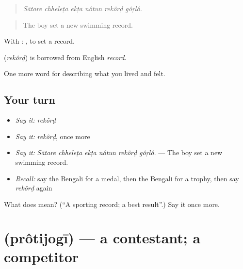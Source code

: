 \begin{quote}
     
\end{quote}

\begin{quote}
\emph{Sā̃tāre chheleṭā ekṭā nôtun rekôrḍ gôṛlô.}
\end{quote}

\begin{quote}
The boy set a new swimming record.
\end{quote}

With :  , to set a record.

\begin{cousinweb}
\textbf{} (\emph{rekôrḍ}) is borrowed from English \emph{record}.
\end{cousinweb}

\begin{grammarlens}[title={What you've built}]
One more word for describing what you lived and felt.
\end{grammarlens}

\subsection*{Your turn}
\begin{itemize}
\raggedright
  \item \emph{Say it:} \emph{rekôrḍ}
  \item \emph{Say it:} \emph{rekôrḍ}, once more
  \item \emph{Say it:} \emph{Sā̃tāre chheleṭā ekṭā nôtun rekôrḍ gôṛlô.} — The boy set a new swimming record.
  \item \emph{Recall:} say the Bengali for a medal, then the Bengali for a trophy, then say \emph{rekôrḍ} again
\end{itemize}

\begin{tcolorbox}[breakable,colback=teal!4,colframe=teal!35!black,title={Before you move on}]
What does  mean? (\textquotedblleft{}A sporting record; a best result\textquotedblright{}.) Say it once more.
\end{tcolorbox}
\section[\texorpdfstring{\bn{প্রতিযোগী} (prôtijogī)}{প্রতিযোগী (prôtijogī)}]{ (prôtijogī) — a contestant; a competitor}

